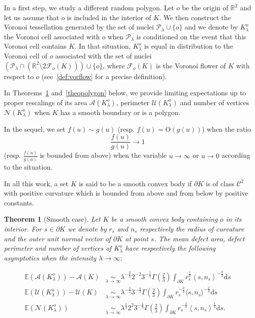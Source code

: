 \documentclass[10pt]{amsart}
\newtheorem{theo}{Theorem}[section]
\theoremstyle{definition}\newtheorem{defi}[theo]{Definition}\newtheorem{rema}[theo]{Remark}\newtheorem{exam}[theo]{Example}\newtheorem{exem}[theo]{Example}\newtheorem{nota}[theo]{Notation}
\newcommand{\cA}{\mathcal{A}}
\newcommand{\cC}{\mathcal{C}}
\newcommand{\cF}{\mathcal{F}}
\newcommand{\cN}{\mathcal{N}}
\newcommand{\cP}{\mathcal{P}}
\newcommand{\cU}{\mathcal{U}}
\newcommand{\la}{\lambda}
\newcommand{\dd}{\mathrm{d}}
\newcommand{\Odd}{\mathrm{O}}
\newcommand{\E}{\mathbb{E}}
\newcommand{\R}{\mathbb{R}}
\newcommand{\pass}{\vspace{0.3cm}\noindent}
\begin{document}
In a first step, we study a different random polygon. Let $o$ be the origin of $\R^2$ and let us assume that $o$ is included in the interior of $K$. We then construct the Voronoi tessellation generated by the set of nuclei $\cP_\la\cup\{o\}$ and we denote by $K_{\lambda}^o$ the Voronoi cell associated with $o$ when $\cP_\lambda$ is conditioned on the event that this Voronoi cell contains $K$. In that situation, $K_{\lambda}^o$ is equal in distribution to the Voronoi cell of $o$ associated with the set of nuclei $(\cP_{\lambda}\cap (\R^2\setminus 2\cF_o(K)))\cup\{o\}$, where $\cF_o(K)$ is the Voronoi flower of $K$ with respect to $o$ (see~\eqref{def:vorflow} for a precise definition).

In Theorems~\ref{theosmooth} and~\ref{theopolygon} below, we provide limiting expectations up to proper rescalings of its area $\cA(K_{\lambda}^o)$, perimeter $\cU(K_{\lambda}^o)$ and number of vertices $\cN(K_{\lambda}^o)$ when $K$ has a smooth boundary or is a polygon.

In the sequel, we set $f(u){\sim} g(u)$ (resp. $f(u){=}\Odd(g(u))$) when the ratio
\[
\frac{f(u)}{g(u)} \to 1
\]
(resp. $\tfrac{f(u)}{g(u)}$ is bounded from above) when the variable $u\to\infty$ or $u\to0$ according to the situation.

In all this work, a set $K$ is said to be a smooth convex body if $\partial K$ is of class $\cC^2$ with positive curvature which is bounded from above and from below by positive constants.


\begin{theo}[Smooth case]\label{theosmooth}
Let $K$ be a smooth convex body containing $o$ in its interior. For $s\in\partial K$ we denote by $r_s$ and $n_s$ respectively the radius of curvature and the outer unit normal vector of $\partial K$ at point $s$. The mean defect area, defect perimeter and number of vertices of $K_{\lambda}^o$ have respectively the following asymptotics when the intensity $\lambda\to\infty:$

\begin{align}
\tag{$\rm i$} \E(\cA(K_{\lambda}^o))-\cA(K)  &\underset{\lambda\to\infty}{\sim}
\lambda^{-\frac{2}{3}} 2^{-2}3^{-\frac1{3}}\Gamma\left(\frac{2}{3}\right)\int_{\partial K} r_s^{\frac1{3}}\left\langle s,n_s\right\rangle^{-\frac{2}{3}}\dd s\label{theo1.1.i}\\
\tag{$\rm ii$} \E(\cU(K_{\lambda}^o))-\cU(K) &\underset{\lambda\to\infty}{\sim}
\lambda^{-\frac{2}{3}} 3^{-\frac{4}{3}}\Gamma\left(\frac{2}{3}\right)\int_{\partial K} r_s^{-\frac{2}{3}}\langle s,n_s\rangle^{-\frac{2}{3}}\dd s \label{theo1.1.ii}\\
\tag{$\rm iii$}\label{theo1.1.iii} \E(\cN(K_{\lambda}^o)) &\underset{\lambda\to\infty}{\sim}
\lambda^{\frac{1}{3}}2^2 3^{-\frac{4}{3}}\Gamma\left(\frac{2}{3}\right)\int_{\partial K} r_s^{-\frac{2}{3}}\left\langle s,n_s\right\rangle^{\frac1{3}}\dd s.
\end{align}
\end{theo}
\end{document}
